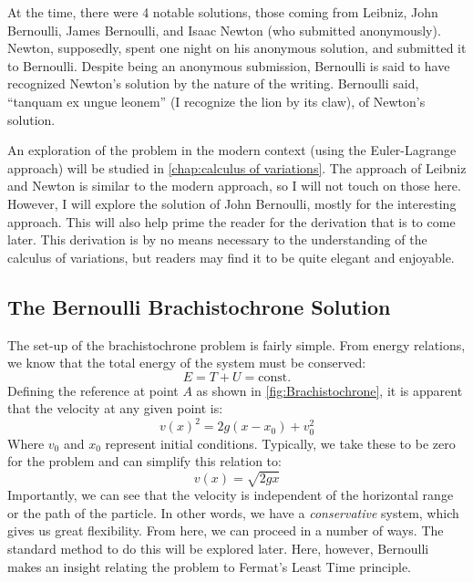 At the time, there were 4 notable solutions, those coming from Leibniz, John Bernoulli, James Bernoulli, and Isaac Newton (who submitted anonymously). Newton, supposedly, spent one night on his anonymous solution, and submitted it to Bernoulli. Despite being an anonymous submission, Bernoulli is said to have recognized Newton's solution by the nature of the writing. Bernoulli said, ``tanquam ex ungue leonem'' (I recognize the lion by its claw), of Newton's solution.

An exploration of the problem in the modern context (using the Euler-Lagrange approach) will be studied in \autoref{chap:calculus of variations}. The approach of Leibniz and Newton is similar to the modern approach, so I will not touch on those here. However, I will explore the solution of John Bernoulli, mostly for the interesting approach. This will also help prime the reader for the derivation that is to come later. This derivation is by no means necessary to the understanding of the calculus of variations, but readers may find it to be quite elegant and enjoyable.

\subsection{The Bernoulli Brachistochrone Solution}
The set-up of the \gls{brachistochrone} problem is fairly simple. From energy relations, we know that the total energy of the system must be conserved:
$$E=T+U=\text{const.}$$
Defining the reference at point $A$ as shown in \autoref{fig:Brachistochrone}, it is apparent that the velocity at any given point is:
$$v(x)^2=2g(x-x_0)+v_0^2$$
Where $v_0$ and $x_0$ represent initial conditions. Typically, we take these to be zero for the problem and can simplify this relation to:
$$v(x)=\sqrt{2gx}$$
Importantly, we can see that the velocity is independent of the horizontal range or the path of the particle. In other words, we have a \textit{conservative} system, which gives us great flexibility. From here, we can proceed in a number of ways. The standard method to do this will be explored later. Here, however, Bernoulli makes an insight relating the problem to Fermat's Least Time principle.

